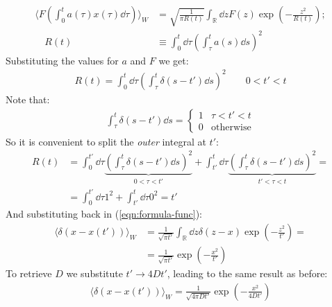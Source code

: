 \documentclass[../template.tex]{subfiles}
\begin{document}
\begin{exo}
    \begin{align} \label{eqn:formula-func}
        \langle F\left(\int_0^t a(\tau) x(\tau) \dd{\tau}\right) \rangle_W &= \sqrt{\frac{1}{\pi R(t)} } \int_{\mathbb{R}} \dd{z} F(z) \exp\left(-\frac{z^2}{R(t)} \right);\\ \nonumber
         \quad R(t) &\equiv \int_0^t \dd{\tau} \left(\int_\tau^t a(s) \dd{s}\right)^2
    \end{align}
    Substituting the values for $a$ and $F$ we get:
    \begin{align*}
        R(t) = \int_0^t \dd{\tau} \left(\int_\tau^t \delta(s-t') \dd{s}\right)^2 \qquad 0<t'<t
    \end{align*}
    Note that:
    \begin{align*}
        \int_\tau^t \delta(s-t')\dd{s} = \begin{cases}
            1 & \tau < t' < t\\
            0 & \text{otherwise}
        \end{cases}
    \end{align*}
    So it is convenient to split the \textit{outer} integral at $t'$:
    \begin{align*}
        R(t) &= \int_0^{t'} \dd{\tau} \underbrace{\left(\int_\tau^t \delta(s-t') \dd{s}\right)^2}_{0<\tau<t'}  + \int_{t'}^t \dd{\tau} \underbrace{\left(\int_\tau^t \delta(s-t') \dd{s}\right)^2}_{t'<\tau<t} =\\
        &=\int_0^{t'} \dd{\tau} 1^2 + \int_{t'}^t \dd{\tau} 0^2 = t'
    \end{align*} 
    And substituting back in (\ref{eqn:formula-func}):
    \begin{align*}
        \langle \delta(x-x(t')) \rangle_W &= \frac{1}{\sqrt{\pi t'}}  \int_{\mathbb{R}} \dd{z} \delta(z-x) \exp\left(-\frac{z^2}{t'} \right) =\\
        &= \frac{1}{\sqrt{ \pi t' }}  \exp\left(-\frac{x^2}{t'} \right)
    \end{align*} 
    To retrieve $D$ we substitute $t' \to 4 D t'$, leading to the same result as before:
    \begin{align*}
        \langle \delta(x-x(t')) \rangle_W = \frac{1}{\sqrt{4 \pi D t'}}  \exp\left(-\frac{x^2}{4 D t'} \right)
    \end{align*}
\end{exo}
\end{document}
